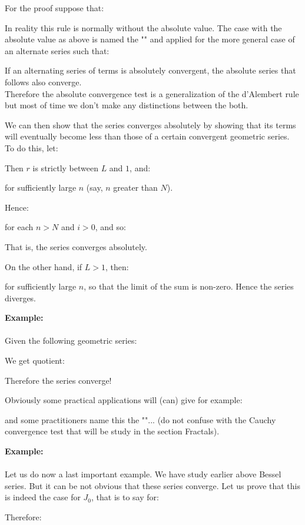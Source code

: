 	For the proof suppose that:
	
	\begin{tcolorbox}[title=Remark,colframe=black,arc=10pt]
	In reality this rule is normally without the absolute value. The case with the absolute value as above is named the "" and applied for the more general case of an alternate series such that:
	
	If an alternating series of terms is absolutely convergent, the absolute series that follows also converge.\\
	
	Therefore the absolute convergence test is a generalization of the d'Alembert rule but most of time we don't make any distinctions between the both.
	\end{tcolorbox}
	We can then show that the series converges absolutely by showing that its terms will eventually become less than those of a certain convergent geometric series. To do this, let:
	
	Then $r$ is strictly between $L$ and $1$, and:
	
	 for sufficiently large $n$ (say, $n$ greater than $N$).

	Hence:
	
	for each $n > N$ and $i > 0$, and so:
	
	That is, the series converges absolutely.

	On the other hand, if $L > 1$, then:
	
	for sufficiently large $n$, so that the limit of the sum is non-zero. Hence the series diverges.
	\begin{tcolorbox}[colframe=black,colback=white,sharp corners]
	\textbf{{\Large {}}Example:}\\\\
	Given the following geometric series:
	
	We get quotient:
	
	Therefore the series converge!
	\end{tcolorbox}
	Obviously some practical applications will (can) give for example:
	
	and some practitioners name this the ""... (do not confuse with the Cauchy convergence test that will be study in the section Fractals).
	
	\begin{tcolorbox}[colframe=black,colback=white,sharp corners]
	\textbf{{\Large {}}Example:}\\\\
	Let us do now a last important example. We have study earlier above Bessel series. But it can be not obvious that these series converge. Let us prove that this is indeed the case for $J_0$, that is to say for:
	
	Therefore:
	
	\end{tcolorbox}
	
